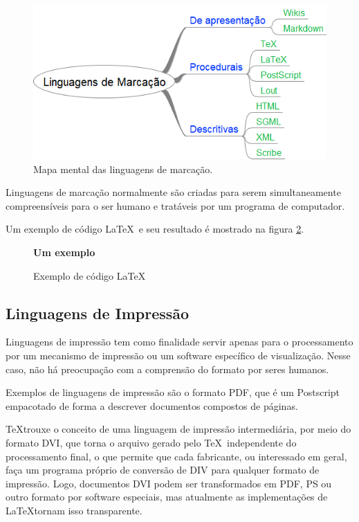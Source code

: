 \begin{figure}
    \centering
    \includegraphics[width=0.7\linewidth]{Images/MMlingmarkup}
    \caption[As linguagens de marcação]{Mapa mental das linguagens de marcação.}
    \label{fig:mmlingmarkup}
\end{figure}

Linguagens de marcação normalmente são criadas para serem simultaneamente compreensíveis para o ser humano e tratáveis por um programa de computador. 

Um exemplo de código \LaTeX\ e seu resultado é mostrado na figura \ref{fig:cod:latex:1}.

\begin{figure}[hbt]
\begin{LTXexample}[pos=b]
    \textbf{Um exemplo} 
\end{LTXexample}
\caption{Exemplo de código \LaTeX}
\label{fig:cod:latex:1}
\end{figure}


\subsection{Linguagens de Impressão}

Linguagens de impressão tem como finalidade servir apenas para o processamento por um mecanismo de impressão ou um software específico de visualização. Nesse caso, não há preocupação com a comprensão do formato por seres humanos.

Exemplos de linguagens de impressão são o formato PDF, que é um Postscript empacotado de forma a descrever documentos compostos de páginas.

\TeX trouxe o conceito de uma linguagem de impressão intermediária, por meio do formato DVI, que torna o arquivo gerado pelo \TeX\  independente do processamento final, o que permite que cada fabricante, ou interessado em geral, faça um programa próprio de conversão de DIV para qualquer formato de impressão. Logo, documentos DVI podem ser transformados em PDF, PS ou outro formato por software especiais, mas atualmente as implementações de \LaTeX tornam isso transparente.



